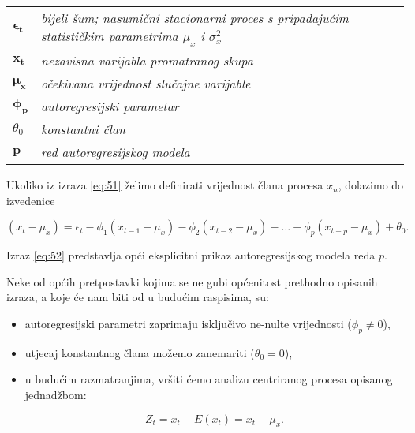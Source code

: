 \documentclass[a4paper,12pt,oneside]{memoir}
\begin{document}
            \begin{table}[H]
                \centering
                \begin{tabular*}{0.9\textwidth}{>{\bfseries}l p{13cm}}
                    \textit{\textbf{$\boldsymbol{\epsilon_t}$}} & \textit{bijeli šum; nasumični stacionarni proces s pripadajućim statističkim parametrima $\mu_x$ i $\sigma_x^2$}\\
                    \textit{\textbf{$\boldsymbol{x_t}$}} & \textit{nezavisna varijabla promatranog skupa}\\
                    \textit{\textbf{$\boldsymbol{\mu_x}$}} & \textit{očekivana vrijednost slučajne varijable}\\
                    \textit{\textbf{$\boldsymbol{\phi_p}$}} & \textit{autoregresijski parametar}\\
                    \textit{\textbf{$\theta_0$}} & \textit{konstantni član}\\
                    \textit{\textbf{$\boldsymbol{p}$}} & \textit{red autoregresijskog modela}\\
                \end{tabular*}
            \end{table}

            Ukoliko iz izraza \ref{eq:51} želimo definirati vrijednost člana procesa $x_n$, dolazimo do izvedenice

            \begin{equation}
                (x_t-\mu_x)=\epsilon_t-\phi_1(x_{t-1}-\mu_x)-\phi_2(x_{t-2}-\mu_x)-\ldots-\phi_p(x_{t-p}-\mu_x)+\theta_0.
                \label{eq:52}
            \end{equation}

            Izraz \ref{eq:52} predstavlja opći eksplicitni prikaz autoregresijskog modela reda $p$.

            Neke od općih pretpostavki kojima se ne gubi općenitost prethodno opisanih izraza, a koje će nam biti od u budućim raspisima, su:

            \begin{itemize}
                \item autoregresijski parametri zaprimaju isključivo ne-nulte vrijednosti ($\phi_p\neq0$),
                \item utjecaj konstantnog člana možemo zanemariti ($\theta_0=0$),
                \item u budućim razmatranjima, vršiti ćemo analizu centriranog procesa opisanog jednadžbom:
                
                \begin{equation}
                    Z_t=x_t-E(x_t)=x_t-\mu_x.
                    \label{eq:53}
                \end{equation}
            \end{itemize}
\end{document}

